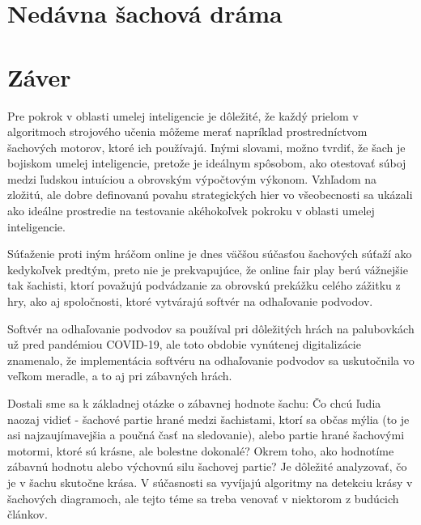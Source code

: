 \documentclass[10pt,oneside,slovak,a4paper]{article}
\begin{document}
\section{Nedávna šachová dráma}



\section{Záver}

Pre pokrok v oblasti umelej inteligencie je dôležité, že každý prielom v algoritmoch strojového učenia môžeme merať napríklad prostredníctvom šachových motorov, ktoré ich používajú. Inými slovami, možno tvrdiť, že šach je bojiskom umelej inteligencie, pretože je ideálnym spôsobom, ako otestovať súboj medzi ľudskou intuíciou a obrovským výpočtovým výkonom. Vzhľadom na zložitú, ale dobre definovanú povahu strategických hier vo všeobecnosti sa ukázali ako ideálne prostredie na testovanie akéhokoľvek pokroku v oblasti umelej inteligencie.

Súťaženie proti iným hráčom online je dnes väčšou súčasťou šachových súťaží ako kedykoľvek predtým, preto nie je prekvapujúce, že online fair play berú vážnejšie tak šachisti, ktorí považujú podvádzanie za obrovskú prekážku celého zážitku z hry, ako aj spoločnosti, ktoré vytvárajú softvér na odhaľovanie podvodov.

Softvér na odhaľovanie podvodov sa používal pri dôležitých hrách na palubovkách už pred pandémiou COVID-19, ale toto obdobie vynútenej digitalizácie znamenalo, že implementácia softvéru na odhaľovanie podvodov sa uskutočnila vo veľkom meradle, a to aj pri zábavných hrách.

Dostali sme sa k základnej otázke o zábavnej hodnote šachu: Čo chcú ľudia naozaj vidieť - šachové partie hrané medzi šachistami, ktorí sa občas mýlia (to je asi najzaujímavejšia a poučná časť na sledovanie), alebo partie hrané šachovými motormi, ktoré sú krásne, ale bolestne dokonalé? Okrem toho, ako hodnotíme zábavnú hodnotu alebo výchovnú silu šachovej partie? Je dôležité analyzovať, čo je v šachu skutočne krása. V súčasnosti sa vyvíjajú algoritmy na detekciu krásy v šachových diagramoch, ale tejto téme sa treba venovať v niektorom z budúcich článkov.








\end{document}
